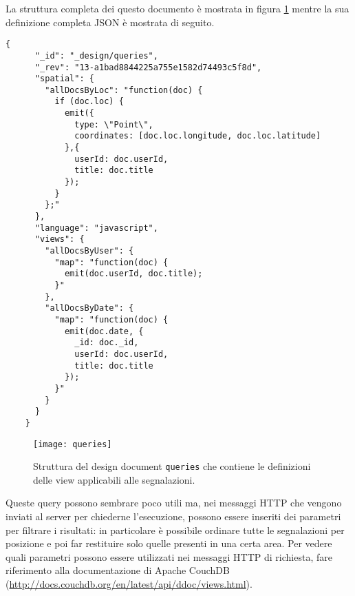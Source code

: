                 La struttura completa dei questo documento è mostrata in
                figura \ref{fig:queries} mentre la sua definizione completa
                JSON è mostrata di seguito.
                \begin{lstlisting}[language=plane]
    {
      "_id": "_design/queries",
      "_rev": "13-a1bad8844225a755e1582d74493c5f8d",
      "spatial": {
        "allDocsByLoc": "function(doc) {
          if (doc.loc) {
            emit({
              type: \"Point\",
              coordinates: [doc.loc.longitude, doc.loc.latitude]
            },{
              userId: doc.userId,
              title: doc.title
            });
          }
        };"
      },
      "language": "javascript",
      "views": {
        "allDocsByUser": {
          "map": "function(doc) {
            emit(doc.userId, doc.title);
          }"
        },
        "allDocsByDate": {
          "map": "function(doc) {
            emit(doc.date, {
              _id: doc._id,
              userId: doc.userId,
              title: doc.title
            });
          }"
        }
      }
    }
                \end{lstlisting}
                \begin{figure}[H]
                    \centering
                    \texttt{[image: queries]}
                    \caption{
                        Struttura del design document \texttt{queries} che
                        contiene le definizioni delle view applicabili alle
                        segnalazioni.
                    }
                    \label{fig:queries}
                \end{figure}
                Queste query possono sembrare poco utili ma, nei messaggi HTTP
                che vengono inviati al server per chiederne l'esecuzione,
                possono essere inseriti dei parametri per filtrare i risultati:
                in particolare è possibile ordinare tutte le segnalazioni per
                posizione e poi far restituire solo quelle presenti in una
                certa area. Per vedere quali parametri possono essere
                utilizzati nei messaggi HTTP di richiesta, fare riferimento
                alla documentazione di Apache CouchDB\texttrademark{}
                (\url{http://docs.couchdb.org/en/latest/api/ddoc/views.html}).

